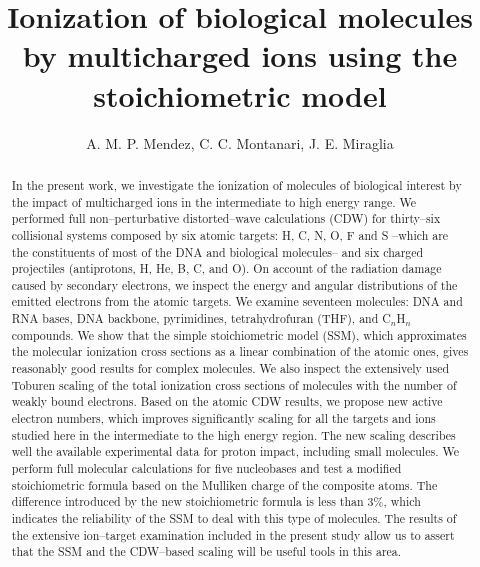 \documentclass[10pt,showpacs,twocolumn]{revtex4}
\begin{document}
\title[Ionization of biological molecules by multicharged 
ions]{Ionization of biological molecules by multicharged ions using 
the stoichiometric model}
\author{A. M. P. Mendez, C. C. Montanari, J. E. Miraglia}
\address{Instituto de Astronom\'{\i}a y F\'{\i}sica del Espacio 
(CONICET--UBA), \\ Buenos Aires, Argentina.}


\begin{abstract}
In the present work, we investigate the ionization of molecules of 
biological interest by the impact of multicharged ions in the 
intermediate to high energy range. We performed full non--perturbative 
distorted--wave calculations (CDW) for thirty--six collisional systems 
composed by six atomic targets: H, C, N, O, F and S --which are the 
constituents of most of the DNA and biological molecules-- and six 
charged projectiles (antiprotons, H, He, B, C, and O). On account of 
the radiation damage caused by secondary electrons, we inspect the 
energy and angular distributions of the emitted electrons from the 
atomic targets. We examine seventeen molecules: DNA and RNA bases, 
DNA backbone, pyrimidines, tetrahydrofuran (THF), and C$_n$H$_n$ 
compounds. We show that the simple stoichiometric model (SSM), which 
approximates the molecular ionization cross sections as a linear 
combination of the atomic ones, gives reasonably good results for 
complex molecules. We also inspect the extensively used Toburen scaling 
of the total ionization cross sections of molecules with the number of 
weakly bound electrons. Based on the atomic CDW results, we 
propose new active electron numbers, which improves significantly 
scaling for all the targets and ions studied here in the intermediate 
to the high energy region. The new scaling describes well the available 
experimental data for proton impact, including small molecules. We 
perform full molecular calculations for five nucleobases and test a 
modified stoichiometric formula based on the Mulliken charge of the 
composite atoms. The difference introduced by the new stoichiometric 
formula is less than 3\%, which indicates the reliability of the SSM to 
deal with this type of molecules. The results of the extensive 
ion--target examination included in the present study allow us to assert 
that the SSM and the CDW--based scaling will be useful tools in this area.
\end{abstract}

\end{document}
